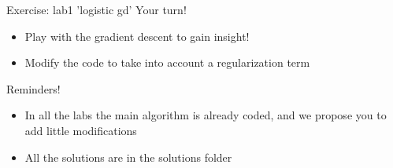 \begin{frame}{Exercise: lab1 'logistic gd'}
    Your turn!

    \begin{itemize}
        \item  Play with the gradient descent to gain insight!
        \item Modify the code to take into account a regularization term
    \end{itemize}

    \vspace{2em}

    Reminders!
    \begin{itemize}
        \item In all the labs the main algorithm is already coded, and we propose you to add little modifications
        \item All the solutions are in the solutions folder
    \end{itemize}
\end{frame}
